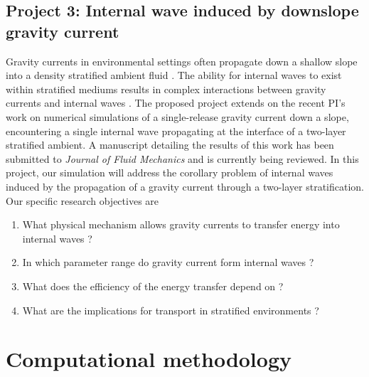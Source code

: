 \documentclass[10pt]{article}
\begin{document}
\subsection*{Project 3: Internal wave induced by downslope gravity current}
Gravity currents in environmental settings often propagate down a shallow slope into a density stratified ambient fluid \citep{Sutherland2010,Baines2008, Snow2014, Biegert2017b}. The ability for internal waves to exist within stratified mediums results in complex interactions between gravity currents and internal waves \citep{Fischer1983, MacIntyre1999, MAXWORTHY2002, Meiburg2010, Cortes2014, Hogg2014, Hogg2017}. The proposed project extends on the recent PI's work on numerical simulations of a single-release gravity current down a slope, encountering a single internal wave propagating at the interface of a two-layer stratified ambient. A manuscript detailing the results of this work has been submitted to \emph{Journal of Fluid Mechanics} and is currently being reviewed.  In this project, our simulation will address the corollary problem of internal waves induced by the propagation of a gravity current through a two-layer stratification. Our specific research objectives are
\begin{enumerate}
\item What physical mechanism allows gravity currents to transfer energy into internal waves ?
\item In which parameter range do gravity current form internal waves ?
\item What does the efficiency of the energy transfer depend on ?
\item What are the implications for transport in stratified environments ?
\end{enumerate}  



\section{Computational methodology}
\end{document}
